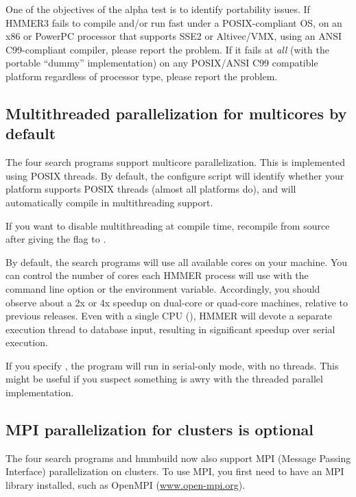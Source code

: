 \begin{sidebar}
One of the objectives of the alpha test is to identify portability
issues. If HMMER3 fails to compile and/or run fast under a
POSIX-compliant OS, on an x86 or PowerPC processor that supports SSE2
or Altivec/VMX, using an ANSI C99-compliant compiler, please report
the problem. If it fails at \emph{all} (with the portable ``dummy''
implementation) on any POSIX/ANSI C99 compatible platform regardless
of processor type, please report the problem.
\end{sidebar}


\subsection{Multithreaded parallelization for multicores by default}

The four search programs support multicore parallelization. This is
implemented using POSIX threads. By default, the configure script will
identify whether your platform supports POSIX threads (almost all
platforms do), and will automatically compile in multithreading
support.

If you want to disable multithreading at compile time, recompile from
source after giving the  flag to
.

By default, the search programs will use all available cores on your
machine.  You can control the number of cores each HMMER process will
use with the  command line option or the
 environment variable. Accordingly, you should
observe about a 2x or 4x speedup on dual-core or quad-core machines,
relative to previous releases. Even with a single CPU (), HMMER will devote a separate execution thread to database
input, resulting in significant speedup over serial execution.  

If you specify , the program will run in serial-only
mode, with no threads. This might be useful if you suspect something
is awry with the threaded parallel implementation.

\subsection{MPI parallelization for clusters is optional}

The four search programs and hmmbuild now also support MPI (Message
Passing Interface) parallelization on clusters.  To use MPI, you first
need to have an MPI library installed, such as OpenMPI
(\url{www.open-mpi.org}).

